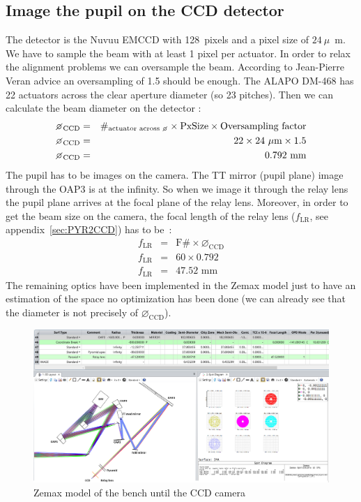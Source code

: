 \documentclass[12pt,a4paper]{article}
\begin{document}
\subsection{Image the pupil on the CCD detector}\label{subsec:4eme_partie}
The detector is the Nuvuu EMCCD with 128~pixels and a pixel size of $24~\mu$~m. We have to sample the beam with at least 1 pixel per actuator. In order to relax the alignment problems we can oversample the beam. According to Jean-Pierre Veran advice an oversampling of 1.5 should be enough. The ALAPO DM-468 has 22 actuators across the clear aperture diameter (so 23 pitches). Then we can calculate the beam diameter on the detector :
\begin{eqnarray}
	\diameter_{\text{CCD}} &= &\#_{\text{actuator across \diameter}}\times \text{PxSize}\times\text{Oversampling factor}\\
	\diameter_{\text{CCD}} &= &22\times 24~\mu\text{m}\times 1.5\\
	\diameter_{\text{CCD}} &= &0.792\,\,\text{mm}
\end{eqnarray}
The pupil has to be images on the camera. The TT mirror (pupil plane) image through the OAP3 is at the infinity. So when we image it through the relay lens the pupil plane arrives at the focal plane of the relay lens. Moreover, in order to get the beam size on the camera, the focal length of the relay lens ($f_{\text{LR}}$, see appendix~\ref{sec:PYR2CCD}) has to be~:
\begin{eqnarray}
	f_{\text{LR}} &= &\text{F}\# \times \diameter_{\text{CCD}}\\
	f_{\text{LR}} &= &60\times 0.792\\
	f_{\text{LR}} &= &47.52\,\,\text{mm}
\end{eqnarray}
The remaining optics have been implemented in the Zemax model just to have an estimation of the space no optimization has been done (we can already see that the diameter is not precisely of $\diameter_\text{CCD}$).\\
\begin{figure}[H]
	\begin{center}
		\includegraphics[width=\textwidth]{images/Zemax_model_FP_CCD.PNG}
		\caption{Zemax model of the bench until the CCD camera}\label{fig:Zemax_model_FP_CCD}
	\end{center}
\end{figure}
\end{document}
